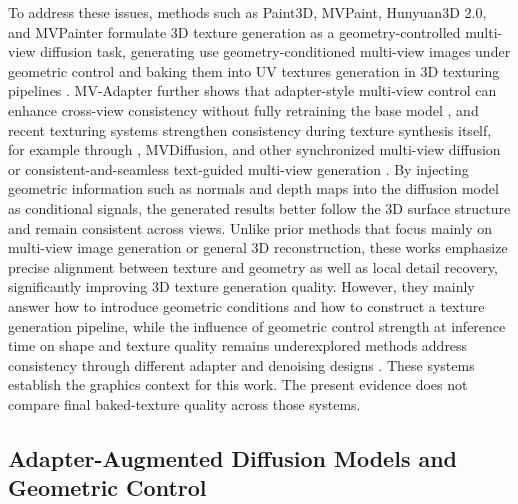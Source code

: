\documentclass[times,twocolumn,final]{elsarticle}
\providecommand{\DIFadd}[1]{{\protect\color{blue} \sf #1}} %
\providecommand{\DIFdel}[1]{{\protect\color{red} \scriptsize #1}} %
\providecommand{\DIFaddbegin}{} %
\providecommand{\DIFaddend}{} %
\providecommand{\DIFdelbegin}{} %
\providecommand{\DIFdelend}{} %
\begin{document}
\DIFdelbegin \DIFdel{To address these issues, methods such as }\DIFdelend Paint3D, MVPaint, Hunyuan3D 2.0, and MVPainter \DIFdelbegin \DIFdel{formulate 3D texture generation as a geometry-controlled multi-view diffusion task, generating }\DIFdelend \DIFaddbegin \DIFadd{use geometry-conditioned }\DIFaddend multi-view \DIFdelbegin \DIFdel{images under geometric control and baking them into UV textures }\DIFdelend \DIFaddbegin \DIFadd{generation in 3D texturing pipelines }\DIFaddend \cite{zeng2024paint3d,cheng2024mvpaint,lai2025hunyuan3d,shao2025mvpainter}. MV-Adapter\DIFdelbegin \DIFdel{further shows that adapter-style multi-view control can enhance cross-view consistency without fully retraining the base model \cite{huang2024mvadapter}, and recent texturing systems strengthen consistency during texture synthesis itself, for example through }\DIFdelend \DIFaddbegin \DIFadd{, MVDiffusion, and other }\DIFaddend synchronized multi-view \DIFdelbegin \DIFdel{diffusion \cite{liu2024synchronized} or consistent-and-seamless text-guided multi-view generation \cite{xu2026wondertex}. By injecting geometric information such as normals and depth maps into the diffusion model as conditional signals, the generated results better follow the 3D surface structure and remain consistent across views. Unlike prior methods that focus mainly on multi-view image generation or general 3D reconstruction, these works emphasize precise alignment between texture and geometry as well as local detail recovery, significantly improving 3D texture generation quality. However, they mainly answer how to introduce geometric conditions and how to construct a texture generation pipeline, while the influence of geometric control strength at inference time on shape and texture quality remains underexplored}\DIFdelend \DIFaddbegin \DIFadd{methods address consistency through different adapter and denoising designs \cite{huang2024mvadapter,tang2023mvdiffusion,liu2024synchronized,xu2026wondertex}. These systems establish the graphics context for this work. The present evidence does not compare final baked-texture quality across those systems}\DIFaddend .

\DIFdelbegin %
\DIFdelend \DIFaddbegin \subsection{Adapter-Augmented Diffusion Models and Geometric Control}
\DIFaddend \label{subsec:adapter}
\end{document}
